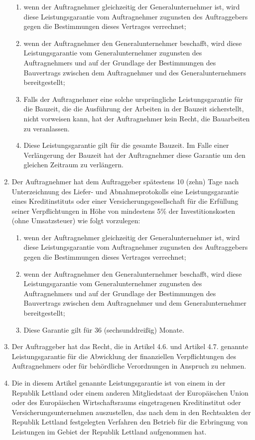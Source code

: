 \begin{multicols}{2}
\begin{enumerate}
   \begin{enumerate}
   \item wenn der Auftragnehmer gleichzeitig der Generalunternehmer ist, wird diese Leistungsgarantie vom Auftragnehmer zugunsten des Auftraggebers gegen die Bestimmungen dieses Vertrages verrechnet;
   \item wenn der Auftragnehmer den Generalunternehmer beschafft, wird diese Leistungsgarantie vom Generalunternehmer zugunsten des Auftragnehmers und auf der Grundlage der Bestimmungen des Bauvertrags zwischen dem Auftragnehmer und des Generalunternehmers bereitgestellt;
   \item Falls der Auftragnehmer eine solche ursprüngliche Leistungsgarantie für die Bauzeit, die die Ausführung der Arbeiten in der Bauzeit sicherstellt, nicht vorweisen kann, hat der Auftragnehmer kein Recht, die Bauarbeiten zu veranlassen.
   \item Diese Leistungsgarantie gilt für die gesamte Bauzeit. Im Falle einer Verlängerung der Bauzeit hat der Auftragnehmer diese Garantie um den gleichen Zeitraum zu verlängern.
   \end{enumerate}
   \item Der Auftragnehmer hat dem Auftraggeber spätestens 10 (zehn) Tage nach Unterzeichnung des Liefer- und Abnahmeprotokolls eine Leistungsgarantie eines Kreditinstituts oder einer Versicherungsgesellschaft für die Erfüllung seiner Verpflichtungen in Höhe von mindestens 5\% der Investitionskosten (ohne Umsatzsteuer) wie folgt vorzulegen:
   \begin{enumerate}
   \item wenn der Auftragnehmer gleichzeitig der Generalunternehmer ist, wird diese Leistungsgarantie vom Auftragnehmer zugunsten des Auftraggebers gegen die Bestimmungen dieses Vertrages verrechnet;
   \item wenn der Auftragnehmer den Generalunternehmer beschafft, wird diese Leistungsgarantie vom Generalunternehmer zugunsten des Auftragnehmers und auf der Grundlage der Bestimmungen des Bauvertrags zwischen dem Auftragnehmer und dem Generalunternehmer bereitgestellt;
   \item Diese Garantie gilt für 36 (sechsunddreißig) Monate.
   \end{enumerate}
   \item Der Auftraggeber hat das Recht, die in Artikel 4.6. und Artikel 4.7. genannte Leistungsgarantie für die Abwicklung der finanziellen Verpflichtungen des Auftragnehmers oder für behördliche Verordnungen in Anspruch zu nehmen.
   \item Die in diesem Artikel genannte Leistungsgarantie ist von einem in der Republik Lettland oder einem anderen Mitgliedstaat der Europäischen Union oder des Europäischen Wirtschaftsraums eingetragenen Kreditinstitut oder Versicherungsunternehmen auszustellen, das nach dem in den Rechtsakten der Republik Lettland festgelegten Verfahren den Betrieb für die Erbringung von Leistungen im Gebiet der Republik Lettland aufgenommen hat.
   \end{enumerate}


\end{multicols}
